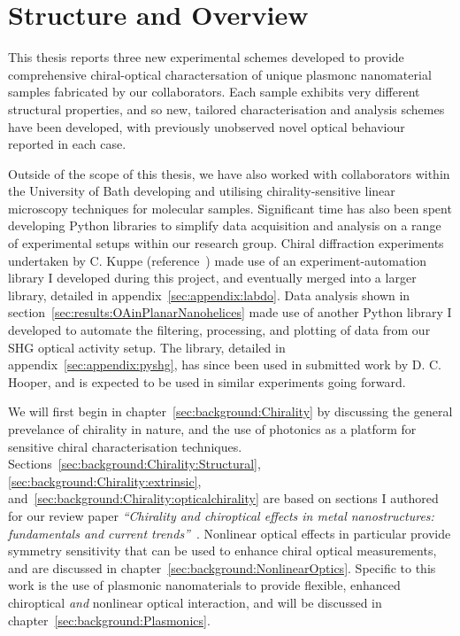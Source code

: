 \chapter{Structure and Overview}\label{sec:background:Introduction}

This thesis reports three new experimental schemes developed to provide comprehensive chiral-optical charactersation of unique plasmonc nanomaterial samples fabricated by our collaborators. Each sample exhibits very different structural properties, and so new, tailored characterisation and analysis schemes have been developed, with previously unobserved novel optical behaviour reported in each case.

Outside of the scope of this thesis, we have also worked with collaborators within the University of Bath developing and utilising chirality-sensitive linear microscopy techniques for molecular samples. Significant time has also been spent developing Python libraries to simplify data acquisition and analysis on a range of experimental setups within our research group. Chiral diffraction experiments undertaken by C. Kuppe (reference~\cite{Kuppe2018}) made use of an experiment-automation library I developed during this project, and eventually merged into a larger library, detailed in appendix~\ref{sec:appendix:labdo}. Data analysis shown in section~\ref{sec:results:OAinPlanarNanohelices} made use of another Python library I developed to automate the filtering, processing, and plotting of data from our SHG optical activity setup. The library, detailed in appendix~\ref{sec:appendix:pyshg}, has since been used in submitted work by D. C. Hooper, and is expected to be used in similar experiments going forward.

We will first begin in chapter~\ref{sec:background:Chirality} by discussing the general prevelance of chirality in nature, and the use of photonics as a platform for sensitive chiral characterisation techniques. Sections~\ref{sec:background:Chirality:Structural}, \ref{sec:background:Chirality:extrinsic}, and~\ref{sec:background:Chirality:opticalchirality} are based on sections I authored for our review paper \textit{``Chirality and chiroptical effects in metal nanostructures: fundamentals and current trends''}~\cite{Collins2017}.
Nonlinear optical effects in particular provide symmetry sensitivity that can be used to enhance chiral optical measurements, and are discussed in chapter~\ref{sec:background:NonlinearOptics}. Specific to this work is the use of plasmonic nanomaterials to provide flexible, enhanced chiroptical \textit{and} nonlinear optical interaction, and will be discussed in chapter~\ref{sec:background:Plasmonics}. 